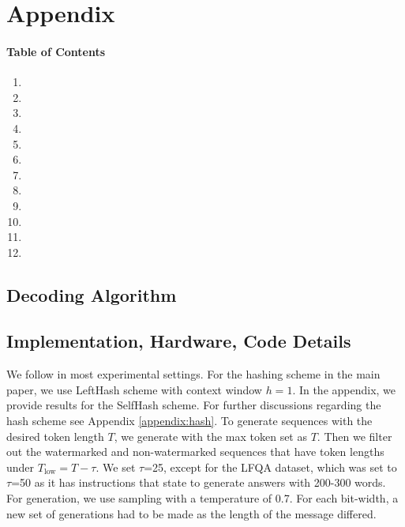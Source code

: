 \section{Appendix}
\paragraph{Table of Contents}\label{para:toc}
\begin{enumerate}
    \item {}
    \item {}
    \item {}
    \item {}
    \item {}
    \item {}
    \item {}
    \item {}
    \item {}
    \item {}
    \item {}
    \item {}
\end{enumerate}

\subsection{Decoding Algorithm}\label{appendix:algo}


\clearpage
\subsection{Implementation, Hardware, Code Details}\label{appendix:imp}
We follow \cite{kirchenbauer2023watermark} in most experimental settings. 
For the hashing scheme in the main paper, we use LeftHash scheme with context window $h=1$. In the appendix, we provide results for the SelfHash scheme. For further discussions regarding the hash scheme see Appendix \ref{appendix:hash}.
To generate sequences with the desired token length $T$, we generate with the max token set as $T$. Then we filter out the watermarked and non-watermarked sequences that have token lengths under $T_\text{low}=T-\tau$. We set $\tau$=25, except for the LFQA dataset, which was set to $\tau$=50 as it has instructions that state to generate answers with 200-300 words. For generation, we use sampling with a temperature of 0.7. For each bit-width, a new set of generations had to be made as the length of the message differed. 

